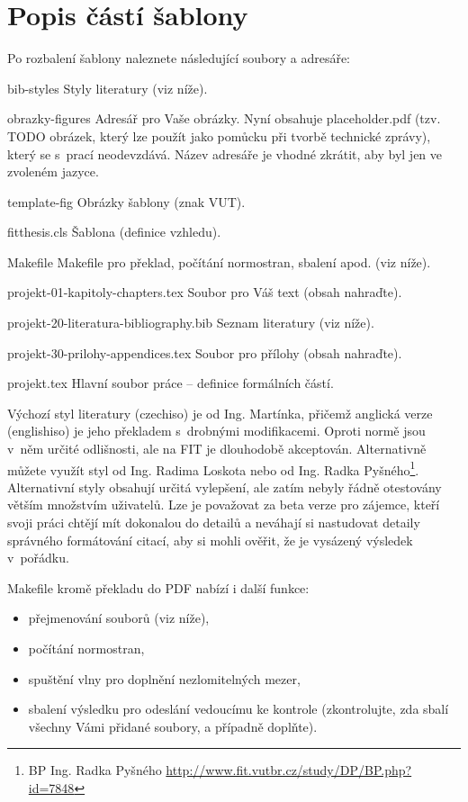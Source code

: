 \section*{Popis částí šablony}

Po rozbalení šablony naleznete následující soubory a adresáře:
\begin{DESCRIPTION}
  \item [bib-styles] Styly literatury (viz níže). 
  \item [obrazky-figures] Adresář pro Vaše obrázky. Nyní obsahuje placeholder.pdf (tzv. TODO obrázek, který lze použít jako pomůcku při tvorbě technické zprávy), který se s~prací neodevzdává. Název adresáře je vhodné zkrátit, aby byl jen ve zvoleném jazyce.
  \item [template-fig] Obrázky šablony (znak VUT).
  \item [fitthesis.cls] Šablona (definice vzhledu).
  \item [Makefile] Makefile pro překlad, počítání normostran, sbalení apod. (viz níže).
  \item [projekt-01-kapitoly-chapters.tex] Soubor pro Váš text (obsah nahraďte).
  \item [projekt-20-literatura-bibliography.bib] Seznam literatury (viz níže).
  \item [projekt-30-prilohy-appendices.tex] Soubor pro přílohy (obsah nahraďte).
  \item [projekt.tex] Hlavní soubor práce -- definice formálních částí.
\end{DESCRIPTION}

Výchozí styl literatury (czechiso) je od Ing. Martínka, přičemž anglická verze (englishiso) je jeho překladem s~drobnými modifikacemi. Oproti normě jsou v~něm určité odlišnosti, ale na FIT je dlouhodobě akceptován. Alternativně můžete využít styl od Ing. Radima Loskota nebo od Ing. Radka Pyšného\footnote{BP Ing. Radka Pyšného \url{http://www.fit.vutbr.cz/study/DP/BP.php?id=7848}}. Alternativní styly obsahují určitá vylepšení, ale zatím nebyly řádně otestovány větším množstvím uživatelů. Lze je považovat za beta verze pro zájemce, kteří svoji práci chtějí mít dokonalou do detailů a neváhají si nastudovat detaily správného formátování citací, aby si mohli ověřit, že je vysázený výsledek v~pořádku.

Makefile kromě překladu do PDF nabízí i další funkce:
\begin{itemize}
  \item přejmenování souborů (viz níže),
  \item počítání normostran,
  \item spuštění vlny pro doplnění nezlomitelných mezer,
  \item sbalení výsledku pro odeslání vedoucímu ke kontrole (zkontrolujte, zda sbalí všechny Vámi přidané soubory, a případně doplňte).
\end{itemize}

